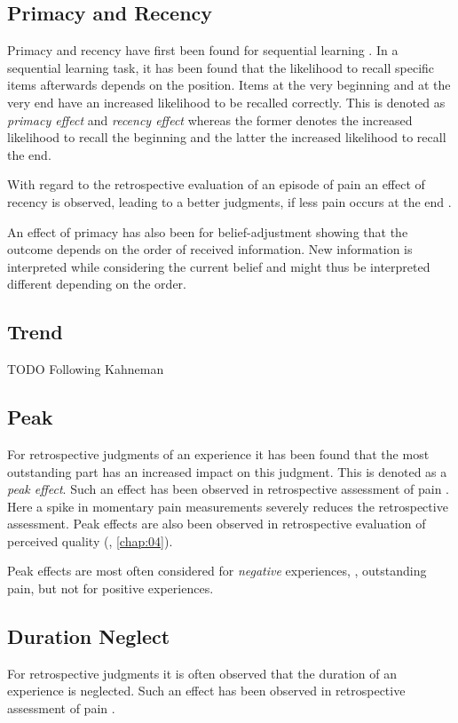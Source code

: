 \subsection{Primacy and Recency}
Primacy and recency have first been found for sequential learning \citep[\cf,][]{murdock_jr._serial_1962}.
In a sequential learning task, it has been found that the likelihood to recall specific items afterwards depends on the position.
Items at the very beginning and at the very end have an increased likelihood to be recalled correctly.
This is denoted as \emph{primacy effect} and \emph{recency effect} whereas the former denotes the increased likelihood to recall the beginning and the latter the increased likelihood to recall the end.

With regard to the retrospective evaluation of an episode of pain an effect of recency is observed, leading to a better judgments, if less pain occurs at the end \citep[\cf,][]{kahneman_when_1993, redelmeier_patients_1996}.

An effect of primacy has also been for belief-adjustment showing that the outcome depends on the order of received information.
New information is interpreted while considering the current belief and might thus be interpreted different depending on the order.

\subsection{Trend}

TODO Following Kahneman

\subsection{Peak}
For retrospective judgments of an experience it has been found that the most outstanding part has an increased impact on this judgment.
This is denoted as a \emph{peak effect}.
Such an effect has been observed in retrospective assessment of pain \citep[\cf,][]{kahneman_when_1993, redelmeier_patients_1996}.
Here a spike in momentary pain measurements severely reduces the retrospective assessment.
Peak effects are also been observed in retrospective evaluation of perceived quality (\cf, \autoref{chap:04}).

Peak effects are most often considered for \emph{negative} experiences, \eg, outstanding pain, but not for positive experiences.

\subsection{Duration Neglect}
For retrospective judgments it is often observed that the duration of an experience is neglected.
Such an effect has been observed in retrospective assessment of pain \citep[\cf,][]{fredrickson_duration_1993, ariely_combining_1998}.


